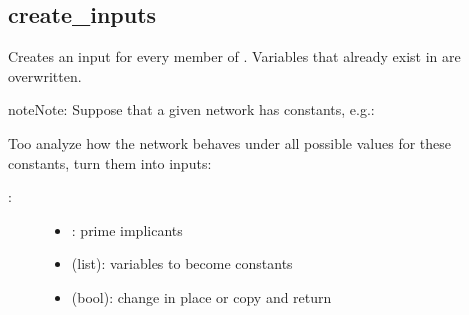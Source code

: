 \documentclass[letterpaper,10pt,english]{sphinxmanual}
\begin{document}
\subsection{create\_inputs}
\label{\detokenize{PrimeImplicants:id9}}\label{\detokenize{PrimeImplicants:create-inputs}}

\begin{fulllineitems}
\label{\detokenize{PrimeImplicants:PyBoolNet.PrimeImplicants.create_inputs}}
Creates an input for every member of .
Variables that already exist in  are overwritten.

\begin{sphinxadmonition}{note}{Note:}
Suppose that a given network has constants, e.g.:

\begin{sphinxVerbatim}[commandchars=\\\{\}]
\end{sphinxVerbatim}

Too analyze how the network behaves under all possible values for these constants, turn them into inputs:

\begin{sphinxVerbatim}[commandchars=\\\{\}]
  
 
\end{sphinxVerbatim}
\end{sphinxadmonition}
\begin{description}
\item[{:}] \leavevmode\begin{itemize}
\item {} 
: prime implicants

\item {} 
 (list): variables to become constants

\item {} 
 (bool): change  in place or copy and return


\end{itemize}
\end{description}
\end{fulllineitems}
\end{document}
